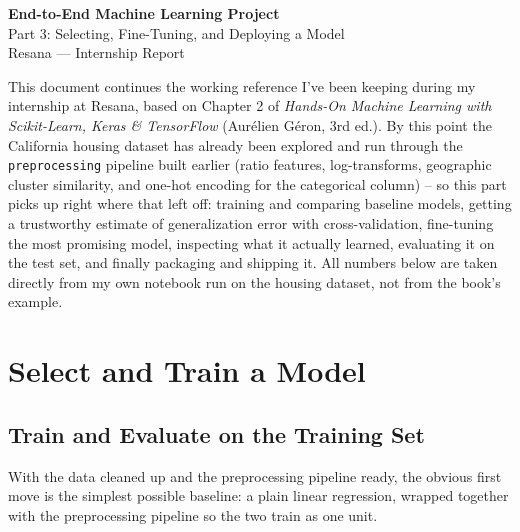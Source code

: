 \documentclass[11pt]{article}
\begin{document}
	
	\begin{center}
		{\LARGE \textbf{End-to-End Machine Learning Project}}\\[4pt]
		{\large Part 3: Selecting, Fine-Tuning, and Deploying a Model}\\[4pt]
		{\normalsize Resana --- Internship Report}
	\end{center}
	
	\vspace{6pt}
	
	This document continues the working reference I've been keeping during my internship at Resana, based on Chapter 2 of \emph{Hands-On Machine Learning with Scikit-Learn, Keras \& TensorFlow} (Aurélien Géron, 3rd ed.). By this point the California housing dataset has already been explored and run through the \texttt{preprocessing} pipeline built earlier (ratio features, log-transforms, geographic cluster similarity, and one-hot encoding for the categorical column) -- so this part picks up right where that left off: training and comparing baseline models, getting a trustworthy estimate of generalization error with cross-validation, fine-tuning the most promising model, inspecting what it actually learned, evaluating it on the test set, and finally packaging and shipping it. All numbers below are taken directly from my own notebook run on the housing dataset, not from the book's example.
	
	\tableofcontents
	\vspace{12pt}
	
	\section{Select and Train a Model}
	
	\subsection{Train and Evaluate on the Training Set}
	
	With the data cleaned up and the preprocessing pipeline ready, the obvious first move is the simplest possible baseline: a plain linear regression, wrapped together with the preprocessing pipeline so the two train as one unit.
	
\end{document}
